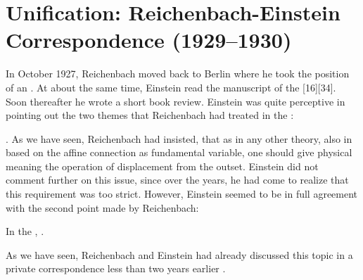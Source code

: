 \documentclass[draft]{article}
\renewcommand{\me}{;~m.e.{}}
\newcommand{\PRZL}{\citetitle{Reichenbach1928}\xspace}
\begin{document}
\section{Unification: Reichenbach-Einstein Correspondence (1929--1930)}
\label{unification}
%
In October 1927, Reichenbach moved back to Berlin where he took the position of an  \citep{Hecht1982}.  At about the same time, Einstein read the manuscript of the \PRZL {}[16][34]. Soon thereafter he wrote a short book review. Einstein was quite perceptive in pointing out the two themes that Reichenbach had treated in the \Ap: \begin{inparaenum}[(1)] \item {} \citep[20\me]{Einstein1928d}. As we have seen, Reichenbach had insisted, that as in any other  theory, also in \uft based on the affine connection as fundamental variable, one should give physical meaning the operation of displacement from the outset. Einstein did not comment further on this issue, since over the years, he had come to realize that this requirement was too strict. However, Einstein seemed to be in full agreement with the second point made by Reichenbach: \item In the \Ap,  \citep[20\me]{Einstein1928d}. \end{inparaenum} As we have seen, Reichenbach and Einstein had already discussed this topic in a private correspondence less than two years earlier . 

\end{document}
